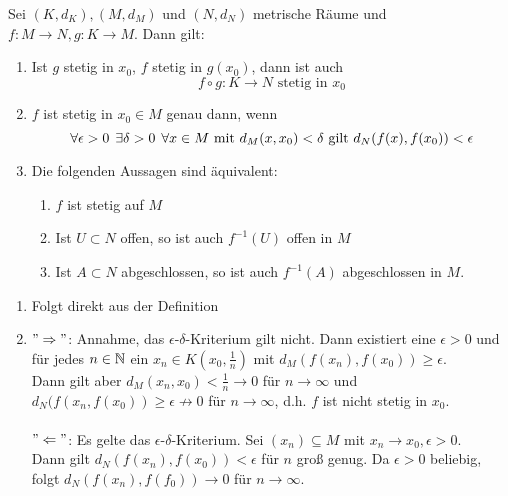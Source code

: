 \begin{prop} \label{prop:4.13}
	Sei $(K,d_{K}), (M, d_{M})$ und $(N, d_{N})$ metrische Räume und $f \colon M \rightarrow N, g \colon K \rightarrow M$. Dann gilt:
	\begin{enumerate}[label=\alph*\upshape)]
		\item Ist $g$ stetig in $x_{0}$, $f$ stetig in $g(x_{0})$, dann ist auch 
			\[ f \circ g \colon K \rightarrow N \text{ stetig in } x_{0} \]
		\item \label{prop:4.13.b} $f$ ist stetig in $x_{0} \in M$ genau dann, wenn 
			\[ \forall \epsilon > 0 \hspace{0.15cm} \exists \delta > 0 \hspace{0.15cm} \forall x \in M \text{ mit } d_{M}(x, x_{0}) < \delta \text{ gilt } d_{N}(f(x), f(x_{0})) < \epsilon \]
		\item Die folgenden Aussagen sind äquivalent:
			\begin{enumerate}
				\item $f$ ist stetig auf $M$
				\item Ist $U \subset N$ offen, so ist auch $f^{-1}(U)$ offen in $M$
				\item Ist $A \subset N$ abgeschlossen, so ist auch $f^{-1}(A)$ abgeschlossen in $M$.
			\end{enumerate}
	\end{enumerate}	
	\begin{beweis}		
		\begin{enumerate}[label=\alph*\upshape)]	
			\item Folgt direkt aus der Definition
			\item $" \Rightarrow "$: Annahme, das $\epsilon$-$\delta$-Kriterium gilt nicht. Dann existiert eine $\epsilon > 0$ und für jedes $n \in \mathbb{N}$ ein $x_{n} \in K(x_{0}, \frac{1}{n})$ mit $d_{M}(f(x_{n}), f(x_{0})) \geq \epsilon$. \\
				Dann gilt aber $d_{M}(x_{n}, x_{0}) < \frac{1}{n} \rightarrow 0$ für $n \rightarrow \infty$ und $d_{N}(f(x_{n}, f(x_{0})) \geq \epsilon \not\rightarrow 0$ für $n \rightarrow \infty$, d.h. $f$ ist nicht stetig in $x_{0}$. \\ \\
				$" \Leftarrow "$: Es gelte das $\epsilon$-$\delta$-Kriterium. Sei $(x_{n}) \subseteq M$ mit $x_{n} \rightarrow x_{0}, \epsilon > 0$. \\
				Dann gilt $d_{N}(f(x_{n}), f(x_{0})) < \epsilon$ für $n$ gro{\ss} genug. Da $\epsilon > 0$ beliebig, folgt $d_{N}(f(x_{n}), f(f_{0})) \rightarrow 0$ für $n \rightarrow \infty$.

\end{enumerate}
\end{beweis}
\end{prop}
